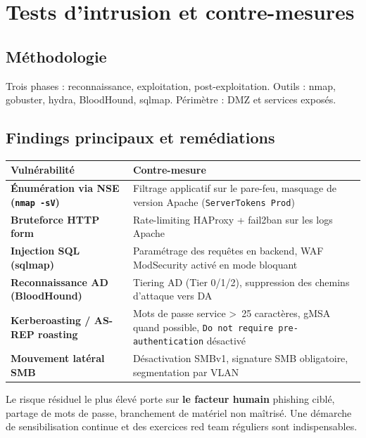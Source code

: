 \documentclass[11pt,a4paper]{article}
\begin{document}
\section{Tests d'intrusion et contre-mesures}

\subsection{Méthodologie}

Trois phases : reconnaissance, exploitation, post-exploitation. Outils : nmap, gobuster, hydra, BloodHound, sqlmap. Périmètre : DMZ et services exposés.

\subsection{Findings principaux et remédiations}

\renewcommand{\arraystretch}{1.4}
\begin{tabularx}{\linewidth}{@{}>{\bfseries}p{4cm} X@{}}
\toprule
\rowcolor{light} Vulnérabilité & Contre-mesure \\ \midrule
Énumération via NSE (\texttt{nmap -sV})       & Filtrage applicatif sur le pare-feu, masquage de version Apache (\texttt{ServerTokens Prod}) \\
Bruteforce HTTP form               & Rate-limiting HAProxy + fail2ban sur les logs Apache \\
Injection SQL (sqlmap)             & Paramétrage des requêtes en backend, WAF ModSecurity activé en mode bloquant \\
Reconnaissance AD (BloodHound)     & Tiering AD (Tier 0/1/2), suppression des chemins d'attaque vers DA \\
Kerberoasting / AS-REP roasting    & Mots de passe service \textgreater{}~25 caractères, gMSA quand possible, \texttt{Do not require pre-authentication} désactivé \\
Mouvement latéral SMB              & Désactivation SMBv1, signature SMB obligatoire, segmentation par VLAN \\
\bottomrule
\end{tabularx}

\begin{alertbox}[title={\faExclamationTriangle~Constat majeur}]
Le risque résiduel le plus élevé porte sur \textbf{le facteur humain} \textemdash{} phishing ciblé, partage de mots de passe, branchement de matériel non maîtrisé. Une démarche de sensibilisation continue et des exercices red team réguliers sont indispensables.
\end{alertbox}
\end{document}
